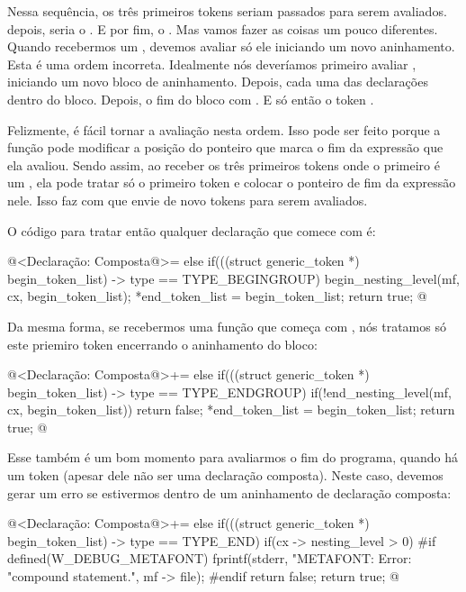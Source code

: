Nessa sequência, os três primeiros tokens seriam passados para serem
avaliados. depois, seria o \monoespaco{[T3][T4]}. E por fim,
o \monoespaco{[endgroup]}. Mas vamos fazer as coisas um pouco
diferentes. Quando recebermos um \monoespaco{[begingroup][T5]},
devemos avaliar só ele iniciando um novo aninhamento. Esta é uma ordem
incorreta. Idealmente nós deveríamos primeiro
avaliar \monoespaco{[begingroup]}, iniciando um novo bloco de
aninhamento. Depois, cada uma das declarações dentro do bloco. Depois,
o fim do bloco com \monoespaco{[endgroup]}. E só então o
token \monoespaco{[T5]}.

Felizmente, é fácil tornar a avaliação nesta ordem. Isso pode ser
feito porque a função  pode modificar a
posição do ponteiro que marca o fim da expressão que ela
avaliou. Sendo assim, ao receber os três primeiros tokens onde o
primeiro é um \monoespaco{[begingroup]}, ela pode tratar só o primeiro
token e colocar o ponteiro de fim da expressão nele. Isso faz com
que  envie de novo
tokens \monoespaco{[T1][T2]} para serem avaliados.

O código para tratar então qualquer declaração que comece
com  é:

\iniciocodigo
@<Declaração: Composta@>=
else if(((struct generic_token *) begin_token_list) -> type ==
        TYPE_BEGINGROUP){
  begin_nesting_level(mf, cx, begin_token_list);
  *end_token_list = begin_token_list;
  return true;
}
@
\fimcodigo

Da mesma forma, se recebermos uma função que começa
com , nós tratamos só este priemiro token
encerrando o aninhamento do bloco:

\iniciocodigo
@<Declaração: Composta@>+=
else if(((struct generic_token *) begin_token_list) -> type ==
        TYPE_ENDGROUP){
  if(!end_nesting_level(mf, cx, begin_token_list))
    return false;
  *end_token_list = begin_token_list;
  return true;
}
@
\fimcodigo

Esse também é um bom momento para avaliarmos o fim do programa, quando
há um token  (apesar dele não ser uma declaração
composta). Neste caso, devemos gerar um erro se estivermos dentro de
um aninhamento de declaração composta:

\iniciocodigo
@<Declaração: Composta@>+=
else if(((struct generic_token *) begin_token_list) -> type ==
        TYPE_END){
  if(cx -> nesting_level > 0){
#if defined(W_DEBUG_METAFONT)
    fprintf(stderr, "METAFONT: Error: %
                    "compound statement.\n", mf -> file);
#endif
    return false;
  }
  return true;
}
@
\fimcodigo


